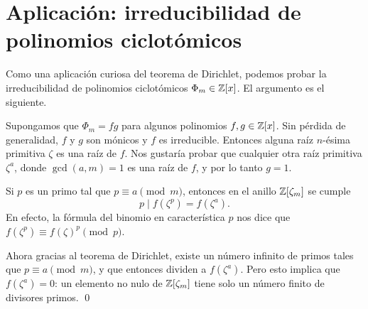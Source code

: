 \section{Aplicación: irreducibilidad de polinomios ciclotómicos}
\label{sec:irreducibilidad-de-Phi-Dirichlet}

Como una aplicación curiosa del teorema de Dirichlet, podemos probar
la irreducibilidad de polinomios ciclotómicos $\Phi_m \in \mathbb{Z} [x]$. El argumento
es el siguiente.

Supongamos que $\Phi_m = fg$ para algunos polinomios $f,g \in \mathbb{Z}[x]$.
Sin pérdida de generalidad, $f$ y $g$ son mónicos y $f$ es irreducible. Entonces
alguna raíz $n$-ésima primitiva $\zeta$ es una raíz de $f$. Nos gustaría
probar que cualquier otra raíz primitiva $\zeta^a$, donde $\gcd (a,m) = 1$ es
una raíz de $f$, y por lo tanto $g = 1$.

Si $p$ es un primo tal que $p \equiv a \pmod{m}$, entonces en el anillo
$\mathbb{Z} [\zeta_m]$ se cumple
$$p \mid f (\zeta^p) = f (\zeta^a).$$
En efecto, la fórmula del binomio en característica $p$ nos dice que
$f (\zeta^p) \equiv f (\zeta)^p \pmod{p}$.

Ahora gracias al teorema de Dirichlet, existe un número infinito de primos tales
que $p \equiv a \pmod{m}$, y que entonces dividen a $f (\zeta^a)$. Pero
esto implica que $f (\zeta^a) = 0$: un elemento no nulo de $\mathbb{Z} [\zeta_m]$ tiene
solo un número finito de divisores primos. \qed
